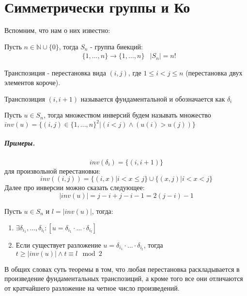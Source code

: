 \chapter{Симметрически группы и Ко}

Вспомним, что нам о них известно:

Пусть $n \in \mathbb{N}\cup\{0\}$, тогда $S_n$ - группа биекций:
\[
	\begin{split}
		&\{1,...,n\} \rightarrow \{1,...,n\}
		&\left|S_n\right| = n!
	\end{split}
\]

\begin{Def}
Транспозиция - перестановка вида $\left(i,j\right)$, где $1\le i<j\le n$ (перестановка двух элементов короче).

Транспозиция $\left(i,i+1\right)$ называется фундаментальной и обозначается как $\delta_i$
\end{Def}

\begin{Def}
Пусть $u \in S_n$, тогда множеством инверсий будем называть множество $inv\left(u\right) = \{\left(i,j\right) \in \{1, ..., n\}^2 | \left(i<j\right)\land\left(u\left(i\right)>u\left(j\right)\right)\}$
\end{Def}

\paragraph{Примеры.} 
\[
	inv\left(\delta_i\right) = \{\left(i,i+1\right)\}
\]
для произвольной перестановки:
\[
	inv\left(\left(i,j\right)\right) = \{\left(i,x\right) | i < x \le j\}\cup\{\left(x,j\right) | i < x < j\}
\]
Далее про инверсии можно сказать следующее:
\[
	\left|inv\left(u\right)\right| = j-i+j-i-1 = 2\left(j-i\right)-1
\]

\begin{Th}
Пусть $u \in S_n$ и $l = \left|inv\left(u\right)\right|$, тогда:
\begin{enumerate}
\item $\exists \delta_{i_1}, ... , \delta_{i_l} : \left[u = \delta_{i_1} \cdot ... \cdot \delta_{i_l}\right]$

\item Если существует разложение $u = \delta_{i_1}\cdot ... \cdot\delta_{i_t}$, тогда $t \ge \left|inv\left(u\right)\right| \land t \equiv l \mod 2$
\end{enumerate}
\end{Th}

В общих словах суть теоремы в том, что любая перестановка раскладывается в произведение фундаментальных транспозиций, а кроме того все они отличаются от кратчайшего разложение на четное число произведений.

